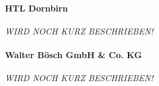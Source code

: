 \paragraph{HTL Dornbirn}

\textit{WIRD NOCH KURZ BESCHRIEBEN!}

\paragraph{Walter Bösch GmbH \& Co. KG}

\textit{WIRD NOCH KURZ BESCHRIEBEN!}
